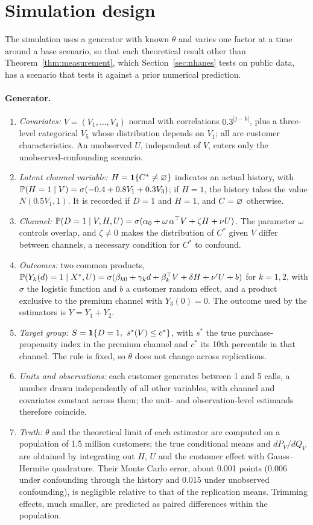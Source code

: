 \section{Simulation design}\label{sec:design}

The simulation uses a generator with known $\theta$ and varies one factor at a time around a base scenario, so that each theoretical result other than Theorem~\ref{thm:measurement}, which Section~\ref{sec:nhanes} tests on public data, has a scenario that tests it against a prior numerical prediction.

\paragraph{Generator.}
\begin{enumerate}
  \item \emph{Covariates:} $V=(V_1,\dots,V_4)$ normal with correlations $0.3^{|j-k|}$, plus a three-level categorical $V_5$ whose distribution depends on $V_1$; all are customer characteristics. An unobserved $U$, independent of $V$, enters only the unobserved-confounding scenario.
  \item \emph{Latent channel variable:} $H=\mathbf{1}\{C^*\ne\varnothing\}$ indicates an actual history, with $\mathbb{P}(H=1\mid V)=\sigma(-0.4+0.8V_1+0.3V_3)$; if $H=1$, the history takes the value $N(0.5V_1,1)$. It is recorded if $D=1$ and $H=1$, and $C=\varnothing$ otherwise.
  \item \emph{Channel:} $\mathbb{P}(D=1\mid V,H,U)=\sigma(\alpha_0+\omega\,\alpha^\top V+\zeta H+\nu U)$. The parameter $\omega$ controls overlap, and $\zeta\ne0$ makes the distribution of $C^*$ given $V$ differ between channels, a necessary condition for $C^*$ to confound.
  \item \emph{Outcomes:} two common products, $\mathbb{P}(Y_k(d)=1\mid X^*,U)=\sigma(\beta_{k0}+\gamma_k d+\beta_k^\top V+\delta H+\nu'U+b)$ for $k=1,2$, with $\sigma$ the logistic function and $b$ a customer random effect, and a product exclusive to the premium channel with $Y_3(0)=0$. The outcome used by the estimators is $Y=Y_1+Y_2$.
  \item \emph{Target group:} $S=\ind\{D=1,\ s^*(V)\le c^*\}$, with $s^*$ the true purchase-propensity index in the premium channel and $c^*$ its 10th percentile in that channel. The rule is fixed, so $\theta$ does not change across replications.
  \item \emph{Units and observations:} each customer generates between 1 and 5 calls, a number drawn independently of all other variables, with channel and covariates constant across them; the unit- and observation-level estimands therefore coincide.
  \item \emph{Truth:} $\theta$ and the theoretical limit of each estimator are computed on a population of 1.5 million customers; the true conditional means and $dP_V/dQ_V$ are obtained by integrating out $H$, $U$ and the customer effect with Gauss--Hermite quadrature. Their Monte Carlo error, about 0.001 points (0.006 under confounding through the history and 0.015 under unobserved confounding), is negligible relative to that of the replication means. Trimming effects, much smaller, are predicted as paired differences within the population.
\end{enumerate}

